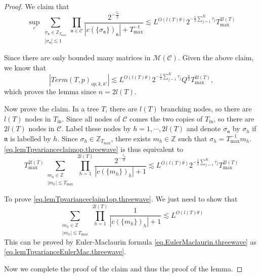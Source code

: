 \begin{proof}
We claim that 
\begin{equation}\label{eq.lemTpvarianceclaimop.threewave}
     \sup_{c}\sum_{\substack{\sigma_{\mathfrak{n}}\in \mathbb{Z}_{T_{\text{max}}}\\ |\sigma_{\mathfrak{n}}|\lesssim 1}} \prod_{\mathfrak{n}\in \mathcal{C}}\frac{2^{-\frac{\tau_{\mathfrak{n}}}{2}}}{|c(\{\sigma_{\mathfrak{n}}\})_{\mathfrak{n}}|+T^{-1}_{\text{max}}}\lesssim L^{O(l(T)\theta)}2^{-\frac{1}{2}\sum_{j=1}^K \tau_{j}} T^{2l(T)}_{\text{max}}
\end{equation}

Since there are only bounded many matrices in $\mathscr{M}(\mathcal{C})$.  Given the above claim, we know that 
\begin{equation}
    |Term(T, p)_{op,k,k'}|\lesssim L^{O(l(T)\theta)} 2^{-\frac{1}{2}\sum_{j=1}^K \tau_{j}} Q^{\frac{n}{2}} T^{2l(T)}_{\text{max}},
\end{equation}
which proves the lemma since $n=2l(T)$.

Now prove the claim. In a tree $T$, there are $l(T)$ branching nodes, so there are $l(T)$ nodes in $T_{\text{in}}$. Since all nodes of $\mathcal{C}$ comes the two copies of $T_{\text{in}}$, so there are $2l(T)$ nodes in $\mathcal{C}$. Label these nodes by $h=1,\cdots,2l(T)$ and denote $\sigma_{\mathfrak{n}}$ by $\sigma_{h}$ if $\mathfrak{n}$ is labelled by $h$. Since $\sigma_{h}\in \mathbb{Z}_{T_{\text{max}}}$, there exists $m_{h}\in \mathbb{Z}$ such that $\sigma_{h}=T^{-1}_{\text{max}} m_{h}$. \eqref{eq.lemTpvarianceclaimop.threewave} is thus equivalent to 
\begin{equation}\label{eq.lemTpvarianceclaim1op.threewave}
    T^{2l(T)}_{\text{max}}\sum_{\substack{m_{h}\in \mathbb{Z}\\ |m_{h}|\lesssim T_{\text{max}}}} \prod_{h=1}^{2l(T)}\frac{2^{-\frac{\tau_{\mathfrak{n}}}{2}}}{|c(\{m_{h}\})_{h}|+1}\lesssim L^{O(l(T)\theta)}2^{-\frac{1}{2}\sum_{j=1}^K \tau_{j}} T^{2l(T)}_{\text{max}}
\end{equation}

To prove \eqref{eq.lemTpvarianceclaim1op.threewave}. We just need to show that 
\begin{equation}
    \sum_{\substack{m_{h}\in \mathbb{Z}\\ |m_{h}|\lesssim T_{\text{max}}}} \prod_{h=1}^{2l(T)}\frac{1}{|c(\{m_{h}\})_{h}|+1}\lesssim L^{O(l(T)\theta)}
\end{equation}
This can be proved by Euler-Maclaurin formula \eqref{eq.EulerMaclaurin.threewave} as \eqref{eq.lemTpvarianceEulerMac.threewave}.

Now we complete the proof of the claim and thus the proof of the lemma.
\end{proof}


